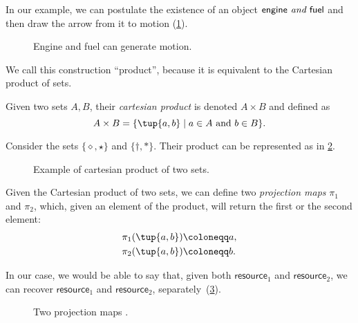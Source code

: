 In our example, we can postulate the existence of an object $\mathsf{engine} \emph{ and }
\mathsf{fuel}$ and then draw the arrow from it to motion (\cref{fig:e13}).

\begin{figure}[h!]
    \centering
    \caption{Engine and fuel can generate motion. \label{fig:e13}}
\end{figure}

We call this construction ``product'', because it is equivalent to
the Cartesian product of sets.

\begin{definition}
\label{def:cartesian-product}
   Given two sets $A,B$, their \emph{cartesian product} is denoted $A\times  B$
   and defined as 
   \begin{equation}
       A\times  B=\{ \tup{a,b}\mid a\in A\text{ and } b\in B\}.
   \end{equation}
\end{definition}

\begin{example}
Consider the sets $\{\diamond,\star\}$ and $\{\dagger, \ast\}$. Their product can be represented as in \cref{fig:cartesian-product}.
\begin{figure}[h!]
    \centering
    \caption{Example of cartesian product of two sets.\label{fig:cartesian-product}}
\end{figure}
\end{example}

\noindent Given the Cartesian product of two sets, we can define two \emph{projection maps} $\pi_1$
and $\pi_2$, which, given an element of the product, will return the first or the second
element:
\begin{equation}
\begin{aligned}
    \pi_1(\tup{a,b}) &\coloneqq a,\\
    \pi_2(\tup{a,b}) &\coloneqq b.
\end{aligned}
\end{equation}

In our case, we would be able to say that, given both $\mathsf{resource}_1$ and $\mathsf{resource}_2$,
we can recover $\mathsf{resource}_1$ and $\mathsf{resource}_2$, separately~(\cref{fig:resource-product}).

\begin{figure}[h!]
    \centering
    \caption{Two projection maps \label{fig:resource-product}.}
\end{figure}


